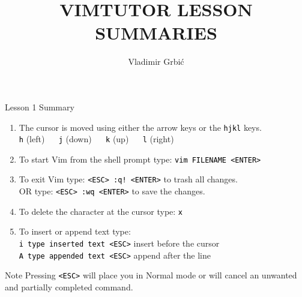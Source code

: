 \documentclass[handout, 10pt]{beamer}
\title{VIMTUTOR LESSON SUMMARIES}
\author{Vladimir Grbić}
\institute{\href{https://vladimirgrbic.com}{vladimirgrbic.com}}
\date{} %
\newcommand{\code}[2][black]{\textcolor{#1}{\colorbox{codegray}{\texttt{#2}}}}
\begin{document}
\begin{frame}
	\titlepage
\end{frame}

\begin{frame}{Lesson 1 Summary}
	\begin{enumerate}
		\item The cursor is moved using either the arrow keys or the
			\code{hjkl} keys. \\
		\code{h} (left) $ \quad $ \code{j} (down) $ \quad $ \code{k} (up) $
		\quad $ \code{l} (right)

		\item To start Vim from the shell prompt type: \code{vim FILENAME
			<ENTER>}

		\item To exit Vim type: \code{<ESC> :q! <ENTER>} to trash all
			changes. \\
		OR type: \code{<ESC> :wq <ENTER>} to save the changes.

		\item To delete the character at the cursor type: \code{x}

		\item To insert or append text type: \\
		\code{i type inserted text <ESC>} insert before the cursor \\
		\code{A type appended text <ESC>} append after the line
	\end{enumerate}
	\begin{block}{Note}
		Pressing \code{<ESC>} will place you in Normal mode or will cancel an
		unwanted and partially completed command.
	\end{block}
\end{frame}
\end{document}
